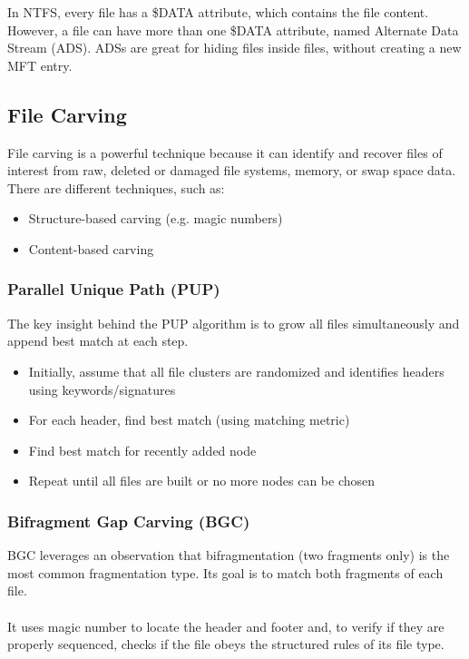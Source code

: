\documentclass[10pt,a4paper]{report}
\begin{document}
In NTFS, every file has a \$DATA attribute, which contains the file content. However, a file can have more than one \$DATA attribute, named Alternate Data Stream (ADS). ADSs are great for hiding files inside files, without creating a new MFT entry.
\subsection{File Carving}
File carving is a powerful technique because it can identify and recover files of interest from raw, deleted or damaged file systems, memory, or swap space data. There are different techniques, such as:
\begin{itemize}
\item Structure-based carving (e.g. magic numbers)
\item Content-based carving
\end{itemize}
\subsubsection{Parallel Unique Path (PUP)}
The key insight behind the PUP algorithm is to grow all files simultaneously and append best match at each step.
\begin{itemize}
\item Initially, assume that all file clusters are randomized and identifies headers using keywords/signatures
\item For each header, find best match (using matching metric)
\item Find best match for recently added node
\item Repeat until all files are built or no more nodes can be chosen
\end{itemize}
\subsubsection{Bifragment Gap Carving (BGC)}
BGC leverages an observation that bifragmentation (two fragments only) is the most common fragmentation type. Its goal is to match both fragments of each file.\\
\\
It uses magic number to locate the header and footer and, to verify if they are properly sequenced, checks if the file obeys the structured rules of its file type.
\end{document}
